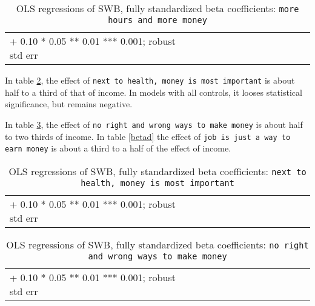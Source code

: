 \documentclass[10pt, letterpaper]{article}
\begin{document}
\begin{spacing}{1.8}
\begin{spacing}{.9} \begin{table}[H]\centering   \begin{scriptsize} \begin{tabular}{p{1.8in}p{.5in}p{.5in}p{.5in}p{.5in}p{.5in}p{.5in}p{.5in}p{.5in}p{.5in}p{.5 in}p{.5in}p{.5 in}}\hline  \hline + 0.10 * 0.05 ** 0.01 *** 0.001; robust std err \end{tabular}\end{scriptsize}\caption{\label{betaa}OLS regressions of SWB, fully standardized beta coefficients: \texttt{more hours and more money}}\end{table} \end{spacing}
 
In table \ref{betab}, the effect of \texttt{next to  health, money is most important} is about half to a third of that of income. In models with all controls, it looses statistical significance, but remains negative. 

In table \ref{betac}, the effect of \texttt{no right  and wrong ways to make money} is about half to two thirds of income. In table \ref{betad} the effect of \texttt{job is just a way to earn money} is about a third to a half of the effect of income.

\begin{spacing}{.9} \begin{table}[H]\centering   \begin{scriptsize} \begin{tabular}{p{1.8in}p{.5in}p{.5in}p{.5in}p{.5in}p{.5in}p{.5in}p{.5in}p{.5in}p{.5in}p{.5 in}p{.5in}p{.5 in}}\hline  \hline + 0.10 * 0.05 ** 0.01 *** 0.001; robust std err \end{tabular}\end{scriptsize}\caption{\label{betab}OLS regressions of SWB, fully standardized beta coefficients: \texttt{next to  health, money is most  important}}\end{table} \end{spacing}

\begin{spacing}{.9} \begin{table}[H]\centering   \begin{scriptsize} \begin{tabular}{p{1.8in}p{.5in}p{.5in}p{.5in}p{.5in}p{.5in}p{.5in}p{.5in}p{.5in}p{.5in}p{.5 in}p{.5in}p{.5 in}}\hline  \hline + 0.10 * 0.05 ** 0.01 *** 0.001; robust std err \end{tabular}\end{scriptsize}\caption{\label{betac}OLS regressions of SWB, fully standardized beta coefficients: \texttt{no right  and wrong ways to  make money}}\end{table} \end{spacing}


\end{spacing}
\end{document}

